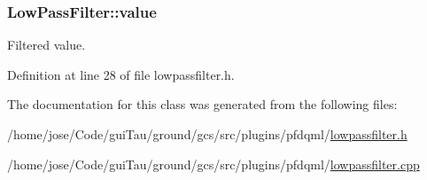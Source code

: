 \hypertarget{class_low_pass_filter_abf649373a1b2f12fc6b6ffa4842dc2f7}{
\subsubsection[{value}]{\setlength{\rightskip}{0pt plus 5cm}Low\-Pass\-Filter\-::value\hspace{0.3cm}{\ttfamily [read]}}}\label{class_low_pass_filter_abf649373a1b2f12fc6b6ffa4842dc2f7}
Filtered value. 

Definition at line 28 of file lowpassfilter.\-h.



The documentation for this class was generated from the following files\-:\begin{DoxyCompactItemize}
\item 
/home/jose/\-Code/gui\-Tau/ground/gcs/src/plugins/pfdqml/\hyperlink{lowpassfilter_8h}{lowpassfilter.\-h}\item 
/home/jose/\-Code/gui\-Tau/ground/gcs/src/plugins/pfdqml/\hyperlink{lowpassfilter_8cpp}{lowpassfilter.\-cpp}\end{DoxyCompactItemize}

